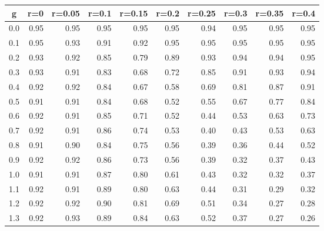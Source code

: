 %
\begin{table}[!tbp]
 \begin{center}
 \begin{tabular}{rrrrrrrrrr}\hline\hline
\multicolumn{1}{c}{g}&\multicolumn{1}{c}{r=0}&\multicolumn{1}{c}{r=0.05}&\multicolumn{1}{c}{r=0.1}&\multicolumn{1}{c}{r=0.15}&\multicolumn{1}{c}{r=0.2}&\multicolumn{1}{c}{r=0.25}&\multicolumn{1}{c}{r=0.3}&\multicolumn{1}{c}{r=0.35}&\multicolumn{1}{c}{r=0.4}\tabularnewline
\hline
0.0&0.95&0.95&0.95&0.95&0.95&0.94&0.95&0.95&0.95\tabularnewline
0.1&0.95&0.93&0.91&0.92&0.95&0.95&0.95&0.95&0.95\tabularnewline
0.2&0.93&0.92&0.85&0.79&0.89&0.93&0.94&0.94&0.95\tabularnewline
0.3&0.93&0.91&0.83&0.68&0.72&0.85&0.91&0.93&0.94\tabularnewline
0.4&0.92&0.92&0.84&0.67&0.58&0.69&0.81&0.87&0.91\tabularnewline
0.5&0.91&0.91&0.84&0.68&0.52&0.55&0.67&0.77&0.84\tabularnewline
0.6&0.92&0.91&0.85&0.71&0.52&0.44&0.53&0.63&0.73\tabularnewline
0.7&0.92&0.91&0.86&0.74&0.53&0.40&0.43&0.53&0.63\tabularnewline
0.8&0.91&0.90&0.84&0.75&0.56&0.39&0.36&0.44&0.52\tabularnewline
0.9&0.92&0.92&0.86&0.73&0.56&0.39&0.32&0.37&0.43\tabularnewline
1.0&0.91&0.91&0.87&0.80&0.61&0.43&0.32&0.32&0.37\tabularnewline
1.1&0.92&0.91&0.89&0.80&0.63&0.44&0.31&0.29&0.32\tabularnewline
1.2&0.92&0.92&0.90&0.81&0.69&0.51&0.34&0.27&0.28\tabularnewline
1.3&0.92&0.93&0.89&0.84&0.63&0.52&0.37&0.27&0.26\tabularnewline
\hline
\end{tabular}

\end{center}

\end{table}

